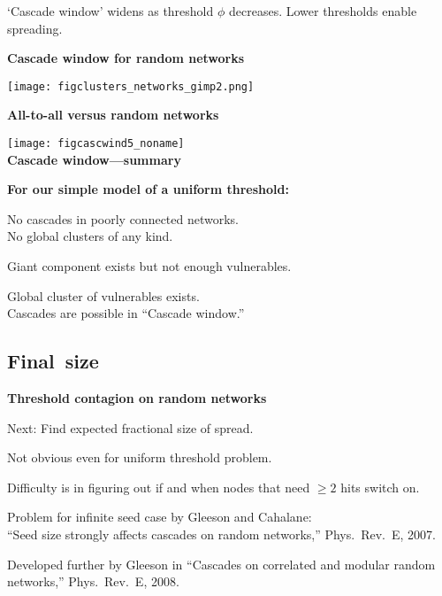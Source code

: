 {{{{  
   \alert{`Cascade window'} widens as threshold $\phi$ decreases.
   Lower thresholds enable spreading.
  


  \textbf{Cascade window for random networks}

  \begin{center}
  \texttt{[image: figclusters\_networks\_gimp2.png]}
  \end{center}


  \textbf{All-to-all versus random networks}
  \centering

  
    \texttt{[image: figcascwind5\_noname]}\\
  



  \textbf{Cascade window---summary}
  
  \textbf{For our simple model of a uniform threshold:}
    
     
       No cascades in poorly connected networks.\\
      No global clusters of any kind.
     
       Giant component exists but not enough vulnerables.
     
       Global cluster of vulnerables exists.\\
      Cascades are possible in \alert{``Cascade window.''}
    
  


\subsection{Final\ size}

  \textbf{Threshold contagion on random networks}

  
  
  
    \alert{Next:} Find expected fractional size of spread.
  
    Not obvious even for uniform threshold problem.
  
    Difficulty is in figuring out if and when
    nodes that need $\ge 2$ hits switch on.
  
    Problem  for infinite seed case by Gleeson and Cahalane:\\
    ``Seed size strongly affects cascades on random networks,'' 
    Phys.\ Rev.\ E, 2007.\cite{gleeson2007a}
  
    Developed further by Gleeson
    in ``Cascades on correlated and modular random networks,'' 
    Phys.\ Rev.\ E, 2008.\cite{gleeson2008a}
  
}}}}
